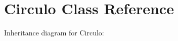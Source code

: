 \hypertarget{class_circulo}{}\section{Circulo Class Reference}
\label{class_circulo}


Inheritance diagram for Circulo\+:
